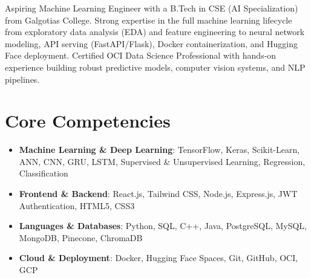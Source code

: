 \documentclass[11pt,a4paper,sans]{moderncv}
\begin{document}
\makecvtitle

\vspace{6pt}
\small{Aspiring Machine Learning Engineer with a B.Tech in CSE (AI Specialization) from Galgotias College. Strong expertise in the full machine learning lifecycle from exploratory data analysis (EDA) and feature engineering to neural network modeling, API serving (FastAPI/Flask), Docker containerization, and Hugging Face deployment. Certified OCI Data Science Professional with hands-on experience building robust predictive models, computer vision systems, and NLP pipelines.}

\section{Core Competencies}
\vspace{1pt}
\begin{itemize}
\item \textbf{Machine Learning \& Deep Learning}: TensorFlow, Keras, Scikit-Learn, ANN, CNN, GRU, LSTM, Supervised \& Unsupervised Learning, Regression, Classification
\item \textbf{Frontend \& Backend}: React.js, Tailwind CSS, Node.js, Express.js, JWT Authentication, HTML5, CSS3
\item \textbf{Languages \& Databases}: Python, SQL, C++, Java, PostgreSQL, MySQL, MongoDB, Pinecone, ChromaDB
\item \textbf{Cloud \& Deployment}: Docker, Hugging Face Spaces, Git, GitHub, OCI, GCP
\end{itemize}
\end{document}
